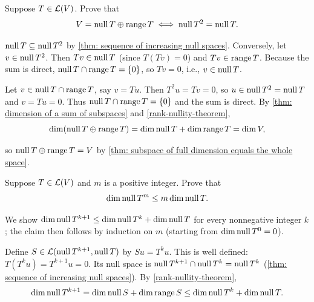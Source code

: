 \begin{xrcs}
  Suppose $T \in \mathcal{L}(V)$. Prove that
  \begin{equation}
    V = \operatorname{null} T \oplus \operatorname{range} T \iff \operatorname{null} T^2 = \operatorname{null} T.
  \end{equation}

\begin{xprf}
  \Rightarrowdirection $\operatorname{null} T \subseteq \operatorname{null} T^2$ by \ref{thm: sequence of increasing null spaces}. Conversely, let $v \in \operatorname{null} T^2$. Then $Tv \in \operatorname{null} T$ (since $T(Tv) = 0$) and $Tv \in \operatorname{range} T$. Because the sum is direct, $\operatorname{null} T \cap \operatorname{range} T = \{0\}$, so $Tv = 0$, i.e., $v \in \operatorname{null} T$.

  \Leftarrowdirection Let $v \in \operatorname{null} T \cap \operatorname{range} T$, say $v = Tu$. Then $T^2 u = Tv = 0$, so $u \in \operatorname{null} T^2 = \operatorname{null} T$ and $v = Tu = 0$. Thus $\operatorname{null} T \cap \operatorname{range} T = \{0\}$ and the sum is direct. By \ref{thm: dimension of a sum of subspaces} and \ref{rank-nullity-theorem},
  \begin{equation}
    \dim (\operatorname{null} T \oplus \operatorname{range} T) = \dim \operatorname{null} T + \dim \operatorname{range} T = \dim V,
  \end{equation}

  so $\operatorname{null} T \oplus \operatorname{range} T = V$ by \ref{thm: subspace of full dimension equals the whole space}.
\end{xprf}
\end{xrcs}

\begin{xrcs}
  Suppose $T \in \mathcal{L}(V)$ and $m$ is a positive integer. Prove that
  \begin{equation}
    \dim \operatorname{null} T^m \leq m \dim \operatorname{null} T.
  \end{equation}

\begin{xprf}
  We show $\dim \operatorname{null} T^{k+1} \leq \dim \operatorname{null} T^k + \dim \operatorname{null} T$ for every nonnegative integer $k$; the claim then follows by induction on $m$ (starting from $\dim \operatorname{null} T^0 = 0$).

  Define $S \in \mathcal{L}(\operatorname{null} T^{k+1}, \operatorname{null} T)$ by $Su = T^k u$. This is well defined: $T(T^k u) = T^{k+1} u = 0$. Its null space is $\operatorname{null} T^{k+1} \cap \operatorname{null} T^k = \operatorname{null} T^k$ (\ref{thm: sequence of increasing null spaces}). By \ref{rank-nullity-theorem},
  \begin{equation}
    \dim \operatorname{null} T^{k+1} = \dim \operatorname{null} S + \dim \operatorname{range} S \leq \dim \operatorname{null} T^k + \dim \operatorname{null} T.
  \end{equation}
  \vspace{-\baselineskip}
\end{xprf}
\end{xrcs}

